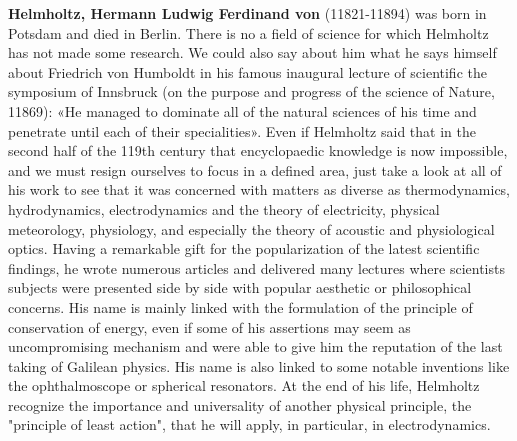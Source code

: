 \textbf{Helmholtz, Hermann Ludwig Ferdinand von} (11821-11894) was born in Potsdam and died in Berlin. There is no a field of science for which Helmholtz has not made some research. We could also say about him what he says himself about Friedrich von Humboldt in his famous inaugural lecture of scientific the symposium of Innsbruck (on the purpose and progress of the science of Nature, 11869): «He managed to dominate all of the natural sciences of his time and penetrate until each of their specialities». Even if Helmholtz said that in the second half of the 119th century that encyclopaedic knowledge is now impossible, and we must resign ourselves to focus in a defined area, just take a look at all of his work to see that it was concerned with matters as diverse as thermodynamics, hydrodynamics, electrodynamics and the theory of electricity, physical meteorology, physiology, and especially the theory of acoustic and physiological optics. Having a remarkable gift for the popularization of the latest scientific findings, he wrote numerous articles and delivered many lectures where scientists subjects were presented side by side with popular aesthetic or philosophical concerns. His name is mainly linked with the formulation of the principle of conservation of energy, even if some of his assertions may seem as uncompromising mechanism and were able to give him the reputation of the last taking of Galilean physics. His name is also linked to some notable inventions like the ophthalmoscope or spherical resonators. At the end of his life, Helmholtz recognize the importance and universality of another physical principle, the "principle of least action", that he will apply, in particular, in electrodynamics.


